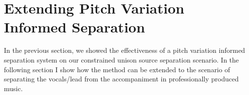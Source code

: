 %

\section{Extending Pitch Variation Informed Separation}


In the previous section, we showed the effectiveness of a pitch variation informed separation system on our constrained unison source separation scenario.
In the following section I show how the method can be extended to the scenario of separating the vocals/lead from the accompaniment in professionally produced music.

